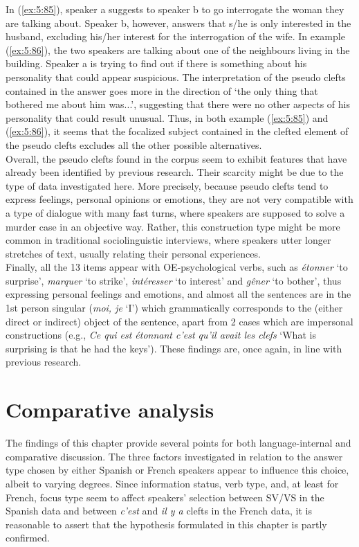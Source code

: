 In (\ref{ex:5:85}), speaker a suggests to speaker b to go interrogate the woman they are talking about. Speaker b, however, answers that s/he is only interested in the husband, excluding his/her interest for the interrogation of the wife. In example (\ref{ex:5:86}), the two speakers are talking about one of the neighbours living in the building. Speaker a is trying to find out if there is something about his personality that could appear suspicious. The interpretation of the pseudo clefts contained in the answer goes more in the direction of `the only thing that bothered me about him was...', suggesting that there were no other aspects of his personality that could result unusual. Thus, in both example (\ref{ex:5:85}) and (\ref{ex:5:86}), it seems that the focalized subject contained in the clefted element of the pseudo clefts excludes all the other possible alternatives.\\
Overall, the pseudo clefts found in the corpus seem to exhibit features that have already been identified by previous research. Their scarcity might be due to the type of data investigated here. More precisely, because pseudo clefts tend to express feelings, personal opinions or emotions, they are not very compatible with a type of dialogue with many fast turns, where speakers are supposed to solve a murder case in an objective way. Rather, this construction type might be more common in traditional sociolinguistic interviews, where speakers utter longer stretches of text, usually relating their personal experiences.\\
Finally, all the 13 items appear with OE-psychological verbs, such as \textit{étonner} `to surprise', \textit{marquer} `to strike', \textit{intéresser} `to interest' and \textit{gêner} `to bother', thus expressing personal feelings and emotions, and almost all the sentences are in the 1st person singular (\textit{moi, je} `I') which grammatically corresponds to the (either direct or indirect) object of the sentence, apart from 2 cases which are impersonal constructions (e.g., \textit{Ce qui est étonnant c'est qu'il avait les clefs} `What is surprising is that he had the keys'). These findings are, once again, in line with previous research.

\section{Comparative analysis}

The findings of this chapter provide several points for both language-internal and comparative discussion. The three factors investigated in relation to the answer type chosen by either Spanish or French speakers appear to influence this choice, albeit to varying degrees. Since information status, verb type, and, at least for French, focus type seem to affect speakers' selection between SV/VS in the Spanish data and between \textit{c'est} and \textit{il y a} clefts in the French data, it is reasonable to assert that the hypothesis formulated in this chapter is partly confirmed.

